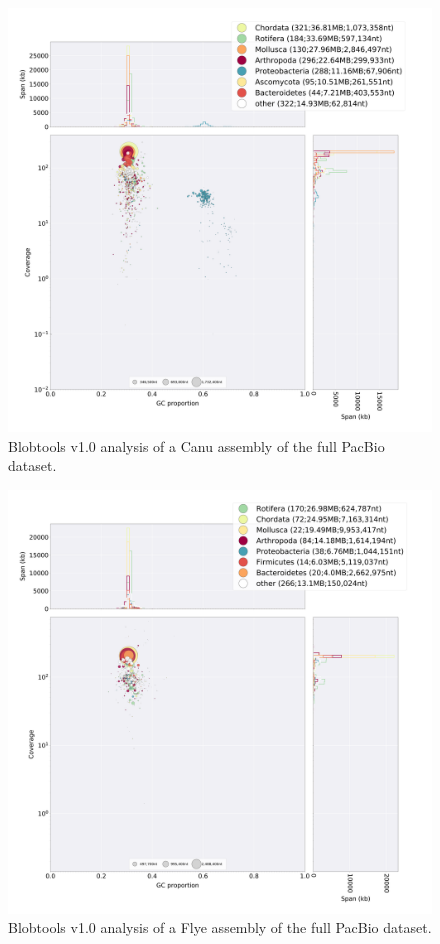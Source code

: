 \begin{suppsection}
  \begin{figure}[ht]
    \centering
     \includegraphics[width=15cm]{fig/benchmark/PB_CANU.png}
   \caption{Blobtools v1.0 analysis of a Canu assembly of the full PacBio dataset.}
   \label{fig:blobtools_canu_pb}
 \end{figure}
 
 \begin{figure}[ht]
    \centering
     \includegraphics[width=15cm]{fig/benchmark/PB_FLYE.png}
   \caption{Blobtools v1.0 analysis of a Flye assembly of the full PacBio dataset.}
   \label{fig:blobtools_flye_pb}
 \end{figure}
 

\end{suppsection}
